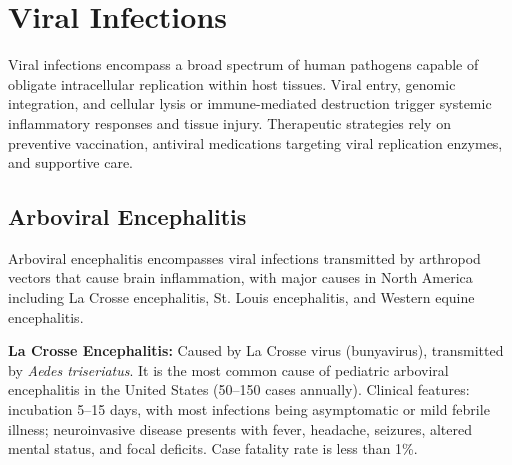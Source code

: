 \section{Viral Infections}




Viral infections encompass a broad spectrum of human pathogens capable of obligate intracellular replication within host tissues. Viral entry, genomic integration, and cellular lysis or immune-mediated destruction trigger systemic inflammatory responses and tissue injury. Therapeutic strategies rely on preventive vaccination, antiviral medications targeting viral replication enzymes, and supportive care.





\label{sec:Viral Infections}

\subsection{Arboviral Encephalitis}
\label{sec:Arboviral Encephalitis}
Arboviral encephalitis encompasses viral infections transmitted by arthropod vectors that cause brain inflammation, with major causes in North America including La Crosse encephalitis, St. Louis encephalitis, and Western equine encephalitis.

\textbf{La Crosse Encephalitis:} Caused by La Crosse virus (bunyavirus), transmitted by \textit{Aedes triseriatus}. It is the most common cause of pediatric arboviral encephalitis in the United States (50--150 cases annually). Clinical features: incubation 5--15 days, with most infections being asymptomatic or mild febrile illness; neuroinvasive disease presents with fever, headache, seizures, altered mental status, and focal deficits. Case fatality rate is less than 1\%.

